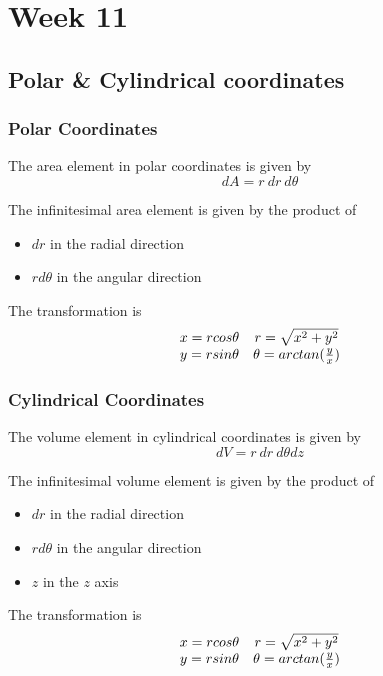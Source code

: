 \chapter{Week 11}

\section{Polar \& Cylindrical coordinates}

\subsection{Polar Coordinates}

\begin{framed}
   The area element in polar coordinates is given by
   \[
     dA = r\ dr\ d \theta
   \] 

   The infinitesimal area element is given by the product of
   \begin{itemize}
      \item $dr$ in the radial direction
      \item $r d \theta$ in the angular direction
   \end{itemize}

   The transformation is 
   \[
      \begin{array}{c c}
         x = r cos \theta & r = \sqrt{x^2 + y^2} \\
         y = r sin \theta & \theta = arctan( \frac{y}{x})
      \end{array}
   \] 
\end{framed}

\subsection{Cylindrical Coordinates}
\begin{framed}
   The volume element in cylindrical coordinates is given by
   \[
     dV = r\ dr\ d \theta dz
   \] 

   The infinitesimal volume element is given by the product of
   \begin{itemize}
      \item $dr$ in the radial direction
      \item $r d \theta$ in the angular direction
      \item $z$ in the $z$ axis
   \end{itemize}

   The transformation is 
   \[
      \begin{array}{c c}
         x = r cos \theta & r = \sqrt{x^2 + y^2} \\
         y = r sin \theta & \theta = arctan( \frac{y}{x})
      \end{array}
   \] 
\end{framed}


